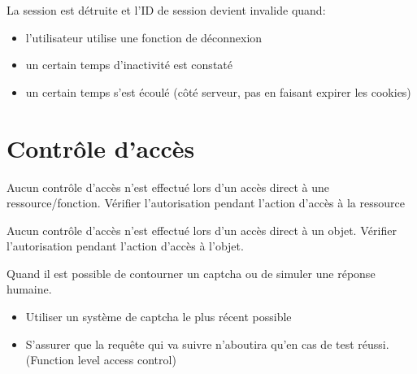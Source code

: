 \documentclass[a4paper]{article}
\begin{document}
\begin{bonnepratique}
    La session est détruite et l’ID de session devient invalide quand:
    \begin{itemize}
        \item l’utilisateur utilise une fonction de déconnexion
        \item un certain temps d’inactivité est constaté
        \item un certain temps s’est écoulé (côté serveur, pas en faisant expirer les cookies)
    \end{itemize}
\end{bonnepratique}















\section{Contrôle d'accès}





\begin{mauvaisepratique}
    Aucun contrôle d’accès n’est effectué lors d’un accès direct à une ressource/fonction.
    Vérifier l’autorisation pendant l’action d’accès à la ressource
\end{mauvaisepratique}

\begin{mauvaisepratique}
    Aucun contrôle d’accès n’est effectué lors d’un accès direct à un objet.
    Vérifier l’autorisation pendant l’action d’accès à l’objet.
\end{mauvaisepratique}

\begin{attaque}
    Quand il est possible de contourner un captcha ou de simuler une réponse humaine.
    \begin{itemize}
        \item Utiliser un système de captcha le plus récent possible
        \item S’assurer que la requête qui va suivre n’aboutira qu’en cas de test réussi. (Function level access control)
    \end{itemize}
\end{attaque}
\end{document}
